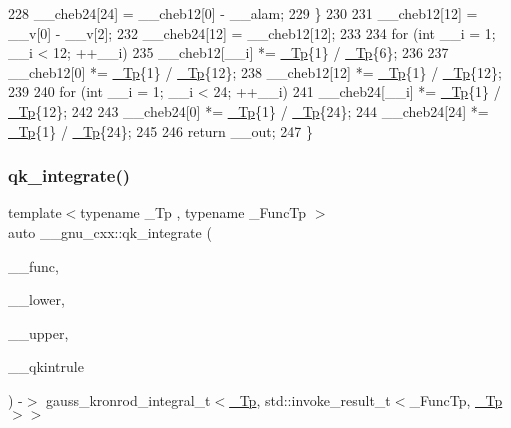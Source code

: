 \begin{DoxyCode}
228         \_\_cheb24[24] = \_\_cheb12[0] - \_\_alam;
229       \}
230 
231       \_\_cheb12[12] = \_\_v[0] - \_\_v[2];
232       \_\_cheb24[12] = \_\_cheb12[12];
233 
234       \textcolor{keywordflow}{for} (\textcolor{keywordtype}{int} \_\_i = 1; \_\_i < 12; ++\_\_i)
235         \_\_cheb12[\_\_i] *= \hyperlink{namespace____gnu__cxx_a3b19a9c800ca194374ef9172290f7d79}{\_Tp}\{1\} / \hyperlink{namespace____gnu__cxx_a3b19a9c800ca194374ef9172290f7d79}{\_Tp}\{6\};
236 
237       \_\_cheb12[0] *= \hyperlink{namespace____gnu__cxx_a3b19a9c800ca194374ef9172290f7d79}{\_Tp}\{1\} / \hyperlink{namespace____gnu__cxx_a3b19a9c800ca194374ef9172290f7d79}{\_Tp}\{12\};
238       \_\_cheb12[12] *= \hyperlink{namespace____gnu__cxx_a3b19a9c800ca194374ef9172290f7d79}{\_Tp}\{1\} / \hyperlink{namespace____gnu__cxx_a3b19a9c800ca194374ef9172290f7d79}{\_Tp}\{12\};
239 
240       \textcolor{keywordflow}{for} (\textcolor{keywordtype}{int} \_\_i = 1; \_\_i < 24; ++\_\_i)
241         \_\_cheb24[\_\_i] *= \hyperlink{namespace____gnu__cxx_a3b19a9c800ca194374ef9172290f7d79}{\_Tp}\{1\} / \hyperlink{namespace____gnu__cxx_a3b19a9c800ca194374ef9172290f7d79}{\_Tp}\{12\};
242 
243       \_\_cheb24[0] *= \hyperlink{namespace____gnu__cxx_a3b19a9c800ca194374ef9172290f7d79}{\_Tp}\{1\} / \hyperlink{namespace____gnu__cxx_a3b19a9c800ca194374ef9172290f7d79}{\_Tp}\{24\};
244       \_\_cheb24[24] *= \hyperlink{namespace____gnu__cxx_a3b19a9c800ca194374ef9172290f7d79}{\_Tp}\{1\} / \hyperlink{namespace____gnu__cxx_a3b19a9c800ca194374ef9172290f7d79}{\_Tp}\{24\};
245 
246       \textcolor{keywordflow}{return} \_\_out;
247     \}
\end{DoxyCode}
\mbox{\label{namespace____gnu__cxx_a02cfb416b1f1cc3a5dd2b12af3877bd4}} 
\subsubsection{\texorpdfstring{qk\+\_\+integrate()}{qk\_integrate()}}
{\footnotesize\ttfamily template$<$typename \+\_\+\+Tp , typename \+\_\+\+Func\+Tp $>$ \\
auto \+\_\+\+\_\+gnu\+\_\+cxx\+::qk\+\_\+integrate (\begin{DoxyParamCaption}\item[{\+\_\+\+Func\+Tp}]{\+\_\+\+\_\+func,  }\item[{\hyperlink{namespace____gnu__cxx_a3b19a9c800ca194374ef9172290f7d79}{\+\_\+\+Tp}}]{\+\_\+\+\_\+lower,  }\item[{\hyperlink{namespace____gnu__cxx_a3b19a9c800ca194374ef9172290f7d79}{\+\_\+\+Tp}}]{\+\_\+\+\_\+upper,  }\item[{Kronrod\+\_\+\+Rule}]{\+\_\+\+\_\+qkintrule }\end{DoxyParamCaption}) -\/$>$ gauss\+\_\+kronrod\+\_\+integral\+\_\+t$<$\hyperlink{namespace____gnu__cxx_a3b19a9c800ca194374ef9172290f7d79}{\+\_\+\+Tp}, std\+::invoke\+\_\+result\+\_\+t$<$\+\_\+\+Func\+Tp, \hyperlink{namespace____gnu__cxx_a3b19a9c800ca194374ef9172290f7d79}{\+\_\+\+Tp}$>$$>$
    }



